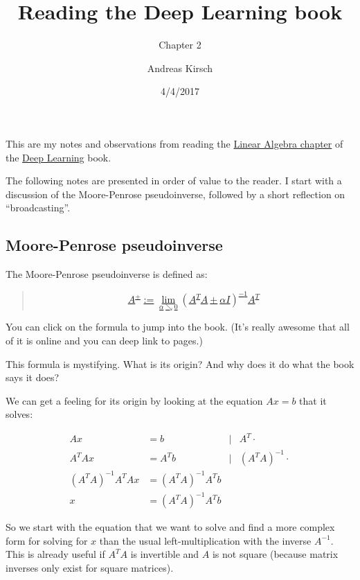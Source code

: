 \documentclass[]{scrartcl}
\title{Reading the Deep Learning book}
\subtitle{Chapter 2}
\author{Andreas Kirsch}
\date{4/4/2017}
\begin{document}
\maketitle

{
\hypersetup{linkcolor=black}
\setcounter{tocdepth}{3}
\tableofcontents
}
This are my notes and observations from reading the
\href{http://www.deeplearningbook.org/contents/linear_algebra.html}{Linear
Algebra chapter} of the \href{http://www.deeplearningbook.org/}{Deep
Learning} book.

The following notes are presented in order of value to the reader. I
start with a discussion of the Moore-Penrose pseudoinverse, followed by
a short reflection on ``broadcasting''.

\subsection{Moore-Penrose
pseudoinverse}\label{moore-penrose-pseudoinverse}

The Moore-Penrose pseudoinverse is defined as:

\begin{quote}
\href{http://www.deeplearningbook.org/contents/linear_algebra.html\#pff}{\[ A^{+}:=\lim _{\alpha \searrow  0}\left( A^{T}A+\alpha I\right) ^{-1}A^{T} \]}
\end{quote}

You can click on the formula to jump into the book. (It's really awesome
that all of it is online and you can deep link to pages.)

This formula is mystifying. What is its origin? And why does it do what
the book says it does?

We can get a feeling for its origin by looking at the equation \(Ax=b\)
that it solves:

\[
\begin{align*} Ax &=b &|& A^{T}\cdot \\ A^{T}Ax &=A^{T}b &|& \left( A^{T}A\right) ^{-1} \cdot \\ \left( A^{T}A\right) ^{-1}A^{T}Ax &=\left( A^{T}A\right) ^{-1}A^{T}b & & \\ x &=\left( A^{T}A\right) ^{-1}A^{T}b  & & \end{align*}
\]

So we start with the equation that we want to solve and find a more
complex form for solving for \(x\) than the usual left-multiplication
with the inverse \(A^{-1}\). This is already useful if \(A^T A\) is
invertible and \(A\) is not square (because matrix inverses only exist
for square matrices).
\end{document}

